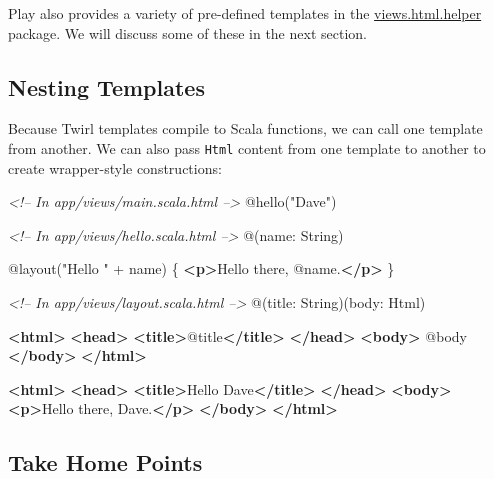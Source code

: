 \documentclass[oneside,11pt,a4paper,]{book}
\newenvironment{Shaded}{\begin{snugshade}}{\end{snugshade}}
\newcommand{\KeywordTok}[1]{\textcolor[rgb]{0.13,0.29,0.53}{\textbf{{#1}}}}
\newcommand{\CommentTok}[1]{\textcolor[rgb]{0.56,0.35,0.01}{\textit{{#1}}}}
\newcommand{\NormalTok}[1]{{#1}}
\begin{document}
Play also provides a variety of pre-defined templates in the
\href{https://www.playframework.com/documentation/2.3.x/api/scala/index.html\#views.html.helper.package}{views.html.helper}
package. We will discuss some of these in the next section.

\subsection{Nesting Templates}\label{nesting-templates}

Because Twirl templates compile to Scala functions, we can call one
template from another. We can also pass \texttt{Html} content from one
template to another to create wrapper-style constructions:

\begin{multicols}{2}

\begin{Shaded}
\begin{Highlighting}[]
\CommentTok{<!-- In app/views/main.scala.html -->}
\NormalTok{@hello("Dave")}

\CommentTok{<!-- In app/views/hello.scala.html -->}
\NormalTok{@(name: String)}

\NormalTok{@layout("Hello " + name) \{}
  \KeywordTok{<p>}\NormalTok{Hello there, @name.}\KeywordTok{</p>}
\NormalTok{\}}

\CommentTok{<!-- In app/views/layout.scala.html -->}
\NormalTok{@(title: String)(body: Html)}

\KeywordTok{<html>}
  \KeywordTok{<head>}
    \KeywordTok{<title>}\NormalTok{@title}\KeywordTok{</title>}
  \KeywordTok{</head>}
  \KeywordTok{<body>}
    \NormalTok{@body}
  \KeywordTok{</body>}
\KeywordTok{</html>}
\end{Highlighting}
\end{Shaded}

\columnbreak

\begin{Shaded}
\begin{Highlighting}[]
\KeywordTok{<html>}
  \KeywordTok{<head>}
    \KeywordTok{<title>}\NormalTok{Hello Dave}\KeywordTok{</title>}
  \KeywordTok{</head>}
  \KeywordTok{<body>}
    \KeywordTok{<p>}\NormalTok{Hello there, Dave.}\KeywordTok{</p>}
  \KeywordTok{</body>}
\KeywordTok{</html>}
\end{Highlighting}
\end{Shaded}

\end{multicols}

\subsection{Take Home Points}\label{take-home-points-5}
\end{document}
